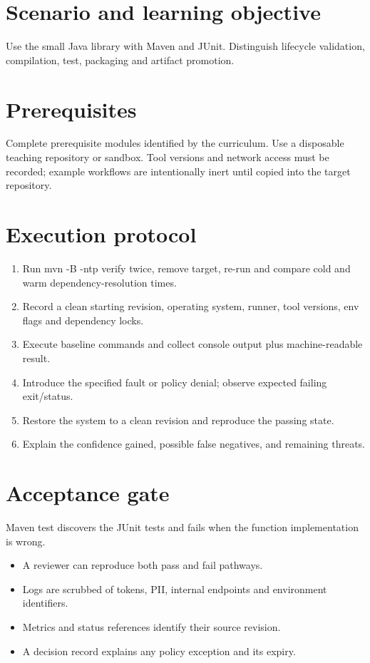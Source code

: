 \documentclass[11pt,letterpaper]{article}
\begin{document}
\makedoctitle
\makedocsummary
\tableofcontents
\clearpage
\section{Scenario and learning objective}
Use the small Java library with Maven and JUnit. Distinguish lifecycle validation, compilation, test, packaging and artifact promotion.

\section{Prerequisites}
Complete prerequisite modules identified by the curriculum. Use a disposable teaching repository or sandbox. Tool versions and network access must be recorded; example workflows are intentionally inert until copied into the target repository.

\section{Execution protocol}
\begin{enumerate}
\item Run mvn -B -ntp verify twice, remove target, re-run and compare cold and warm dependency-resolution times.
\item Record a clean starting revision, operating system, runner, tool versions, env flags and dependency locks.
\item Execute baseline commands and collect console output plus machine-readable result.
\item Introduce the specified fault or policy denial; observe expected failing exit/status.
\item Restore the system to a clean revision and reproduce the passing state.
\item Explain the confidence gained, possible false negatives, and remaining threats.
\end{enumerate}
\section{Acceptance gate}
Maven test discovers the JUnit tests and fails when the function implementation is wrong.

\begin{itemize}
\item A reviewer can reproduce both pass and fail pathways.
\item Logs are scrubbed of tokens, PII, internal endpoints and environment identifiers.
\item Metrics and status references identify their source revision.
\item A decision record explains any policy exception and its expiry.
\end{itemize}
\end{document}
